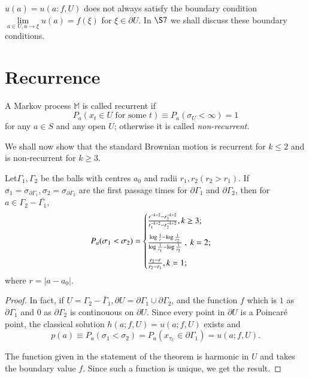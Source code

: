 \begin{remark*}
  $u(a) = u(a:f,U)$ does not always satisfy the boundary condition
  $\lim\limits_{a \in U, a \to \xi} u(a) = f(\xi)$ for $\xi \in
  \partial U$. In $\S 7$ we shall discuss these boundary conditions. 
\end{remark*}

\section{Recurrence}\label{chap3-sec4}%

\begin{defi*}
 A Markov process $\mathbb{M}$ is called {\rm recurrent} if 
  $$
  P_a(x_t \in U \text{ for some }t) \equiv P_a(\sigma_U < \infty)=1
  $$
  for any $a \in S$ and any open $U$; otherwise it is called {\em
    non-recurrent.} 
\end{defi*}

We shall now show that the standard Brownian motion is recurrent for
$k \leq 2 $ and is non-recurrent for $k \geq 3$. 

\setcounter{thm}{0}
\begin{thm}\label{chap3-sec4-thm1}%
  Let\pageoriginale $\Gamma_1, \Gamma_2$ be the balls with centres
  $a_0$ and radii 
  $r_1, r_2(r_2 > r_1)$. If $\sigma_1 = \sigma_{\partial \Gamma_1},
  \sigma_2 = \sigma_{\partial \Gamma_2}$ are the first passage times
  for $\partial \Gamma_1$ and $\partial \Gamma_2$, then for $a \in
  \Gamma_2 - \bar{\Gamma_1}$, 
  \begin{equation*}
    P_a (\sigma_1 < \sigma_2 ) =
    \begin{cases}
      \medskip
      \frac{r^{-k+2}-r^{-k+2}_2}{r^{-k+2}_1 - r^{-k+2}_2} , k \geq 3; \\      
      \medskip
      \frac{\log \frac{1}{r} - \log  \frac{1} {r_2}}{\log
        \frac{1}{r_1} - \log  \frac {1} {r_2}}  ~ , ~  k=2; \\       
      \frac{r_2 - r}{r_2 - r_1}, k =1;
    \end{cases}
\end{equation*}
where $r= |a-a_0|$.
\end{thm}

\begin{proof}
In fact, if $U = \Gamma_2 - \bar{\Gamma}_1, \partial U = \partial
  \Gamma_1 \cup \partial \Gamma_2$, and the function $f$ which is $1$
  as $\partial \Gamma_1$ and $0$ as $\partial \Gamma_2$ is continouous
  on $\partial U$. Since every point in $\partial U$ is a Poincar\'e
  point, the classical solution $h(a; f, U) = u(a; f,U)$ exists and 
  $$
  p(a) \equiv P_a(\sigma_1 < \sigma_2) = P_a (x_{\tau_U} \in \partial
  \Gamma_1) = u(a; f,U). 
  $$

The function given in the statement of the theorem is harmonic in $U$
and takes the boundary value $f$. Since such a function is unique, we
get the result. 
\end{proof}

